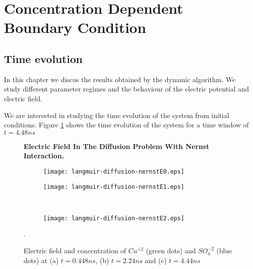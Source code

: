 \newpage
\section{Concentration Dependent Boundary Condition}
\subsection{Time evolution}

In this chapter we discus the results obtained by the dynamic algorithm. We study different parameter regimes and the behaviour of the electric potential and electric field.

We are interested in studying the time evolution of the system from initial conditions. Figure \ref{fig:ef1} shows the time evolution of the system for a time window of $t = 4.48 ns$




\begin{figure}[htbp]
\centering
\textbf{Electric Field In The Diffusion Problem With Nernst Interaction.}\par\medskip
\begin{subfigure}{.5\linewidth}
\centering
\texttt{[image: langmuir-diffusion-nernstE0.eps]}
\caption{}
\label{fig:ef1}
\end{subfigure}%
\begin{subfigure}{.5\linewidth}
\centering
\texttt{[image: langmuir-diffusion-nernstE1.eps]}
\caption{}
\label{fig:ef2}
\end{subfigure}\\[1ex]
\begin{subfigure}{\linewidth}
\centering
\texttt{[image: langmuir-diffusion-nernstE2.eps]}
\caption{}
\label{fig:ef3}
\end{subfigure}
\caption{Electric field and concentration of $Cu^{+2}$ (green dots) and $SO_4^{-2}$ (blue dots) at (a) $t = 0.448 ns$, (b) $t = 2.24 ns$ and (c) $t = 4.44 ns$}.
\label{fig:test}
\end{figure}

